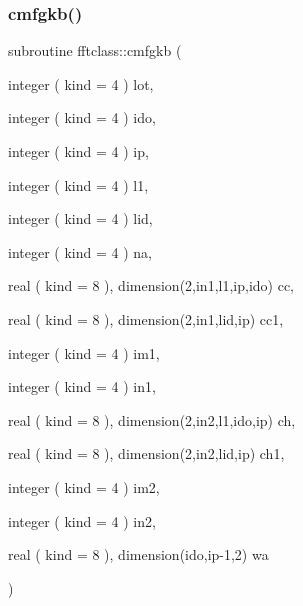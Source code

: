 \subsubsection{\texorpdfstring{cmfgkb()}{cmfgkb()}}
{\footnotesize\ttfamily subroutine fftclass\+::cmfgkb (\begin{DoxyParamCaption}\item[{integer ( kind = 4 )}]{lot,  }\item[{integer ( kind = 4 )}]{ido,  }\item[{integer ( kind = 4 )}]{ip,  }\item[{integer ( kind = 4 )}]{l1,  }\item[{integer ( kind = 4 )}]{lid,  }\item[{integer ( kind = 4 )}]{na,  }\item[{real ( kind = 8 ), dimension(2,in1,l1,ip,ido)}]{cc,  }\item[{real ( kind = 8 ), dimension(2,in1,lid,ip)}]{cc1,  }\item[{integer ( kind = 4 )}]{im1,  }\item[{integer ( kind = 4 )}]{in1,  }\item[{real ( kind = 8 ), dimension(2,in2,l1,ido,ip)}]{ch,  }\item[{real ( kind = 8 ), dimension(2,in2,lid,ip)}]{ch1,  }\item[{integer ( kind = 4 )}]{im2,  }\item[{integer ( kind = 4 )}]{in2,  }\item[{real ( kind = 8 ), dimension(ido,ip-\/1,2)}]{wa }\end{DoxyParamCaption})}

\mbox{\label{namespacefftclass_a317b5c8887b5c2ecb7e518f0c7058589}} 
